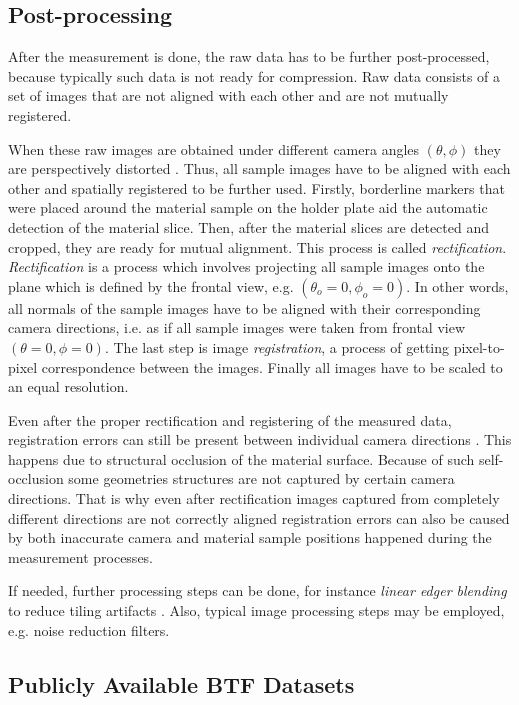 \subsection{Post-processing}
\label{section:Post_processing_acquisition}	
After the measurement is done, the raw data has to be further post-processed, because typically such  data is not ready for compression.
Raw data consists of a set of images that are not aligned with each other and are not mutually registered.

When these raw images are obtained under different camera angles $(\theta,\phi)$ they are perspectively distorted \cite{sattler-2003-efficient}.
Thus, all sample images have to be aligned with each other and spatially registered to be further used.
Firstly, borderline markers that were placed around the material sample on the holder plate aid the automatic detection of the material slice.
Then, after the material slices are detected and cropped, they are ready for mutual alignment. This process is called  \emph{rectification}. 
\emph{Rectification} is a process which involves projecting all sample images onto the plane which is defined by the frontal view, e.g. $(\theta _{o} =0,\phi _{o}=0)$.
In other words, all normals of the sample images have to be aligned with their corresponding camera directions, i.e. as if all sample images were taken from frontal view $(\theta =0,\phi=0)$.
The last step is image \emph{registration}, a process of getting pixel-to-pixel correspondence between the images.
Finally all images have to be scaled to an equal resolution.


Even after the proper rectification and registering of the measured data, registration errors can still be present between individual camera directions \cite{haindl_visual}. 
 This happens due to structural occlusion of the material surface. Because of such self-occlusion some geometries structures are not captured by certain camera directions.
 That is why even after rectification images captured from completely different directions are not correctly aligned
 registration errors can also be caused by both inaccurate camera and material sample positions happened during the measurement processes.


If needed, further processing steps can be done, for instance \emph{linear edger blending} to reduce tiling artifacts \cite{sattler-2003-efficient}.
Also, typical image processing steps may be employed, e.g. noise reduction filters. 


\subsection{Publicly Available BTF Datasets}
\label{section:Publicly_datasets}	

